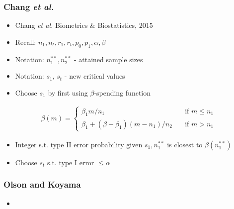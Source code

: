 \documentclass{beamer}\usepackage[]{graphicx}\usepackage[]{color}
\begin{document}

\begin{frame}
\frametitle{Chang \textit{et al.}}
    \begin{itemize}
        \item Chang \textit{et al.} Biometrics \& Biostatistics, 2015
        \item Recall: $n_1, n_t, r_1, r_t, p_0, p_1, \alpha, \beta$
        \item Notation: $n_1^{\ast\ast}, n_2^{\ast\ast}$ - attained sample sizes
        \item Notation: $s_1$, $s_t$ - new critical values
        \item Choose $s_1$ by first using $\beta$-spending function
    \end{itemize}
\begin{equation*}
\begin{aligned}
\beta(m) = \left\{
        \begin{array}{ll}
            \beta_1 m/n_1 & \quad \text{if } m\leq n_1 \\
            \beta_1 + (\beta - \beta_1)(m - n_1)/n_2 & \quad \text{if } m > n_1
        \end{array}
    \right.
\end{aligned}
\end{equation*}
  \begin{itemize}
      \item Integer s.t. type II error probability given $s_1, n_1^{\ast\ast}$ is closest to $\beta(n_1^{\ast\ast})$
      \item Choose $s_t$ s.t. type I error $\leq \alpha$
  \end{itemize}
\end{frame}

\begin{frame}
\frametitle{Olson and Koyama}
    \begin{itemize}
        \item 
    \end{itemize}
\end{frame}
\end{document}
